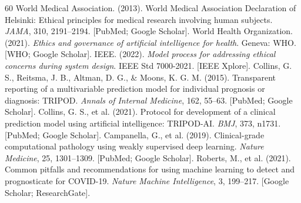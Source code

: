 \documentclass[10pt,a4paper]{article}
\begin{document}
\begin{thebibliography}{60}
 World Medical Association. (2013). World Medical Association Declaration of Helsinki: Ethical principles for medical research involving human subjects. \textit{JAMA}, 310, 2191--2194. [PubMed; Google Scholar].
 World Health Organization. (2021). \textit{Ethics and governance of artificial intelligence for health}. Geneva: WHO. [WHO; Google Scholar].
 IEEE. (2022). \textit{Model process for addressing ethical concerns during system design}. IEEE Std 7000-2021. [IEEE Xplore].
 Collins, G. S., Reitsma, J. B., Altman, D. G., \& Moons, K. G. M. (2015). Transparent reporting of a multivariable prediction model for individual prognosis or diagnosis: TRIPOD. \textit{Annals of Internal Medicine}, 162, 55--63. [PubMed; Google Scholar].
 Collins, G. S., et al. (2021). Protocol for development of a clinical prediction model using artificial intelligence: TRIPOD-AI. \textit{BMJ}, 373, n1731. [PubMed; Google Scholar].
 Campanella, G., et al. (2019). Clinical-grade computational pathology using weakly supervised deep learning. \textit{Nature Medicine}, 25, 1301--1309. [PubMed; Google Scholar].
 Roberts, M., et al. (2021). Common pitfalls and recommendations for using machine learning to detect and prognosticate for COVID-19. \textit{Nature Machine Intelligence}, 3, 199--217. [Google Scholar; ResearchGate].
\end{thebibliography}
\end{document}
